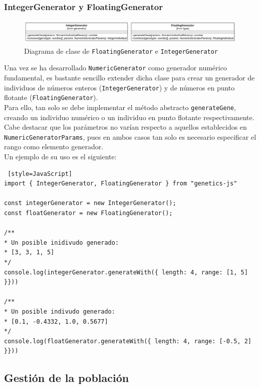 \subsubsection{IntegerGenerator y FloatingGenerator}

\begin{figure}[ht]
    \centering
    \includegraphics[scale=0.42]{mem/images/cap-4/4.2.3(Generador)/IntegerFloating.png}
    \caption{Diagrama de clase de \texttt{FloatingGenerator} e \texttt{IntegerGenerator}}
    \label{fig:generator-uml}
\end{figure}

Una vez se ha desarrollado \texttt{NumericGenerator} como generador numérico fundamental, es bastante sencillo extender dicha clase para crear un generador de individuos de números enteros (\texttt{IntegerGenerator}) y de números en punto flotante (\texttt{FloatingGenerator}). \\

Para ello, tan solo se debe implementar el método abstracto \texttt{generateGene}, creando un individuo numérico o un individuo en punto flotante respectivamente. Cabe destacar que los parámetros no varían respecto a aquellos establecidos en \texttt{NumericGeneratorParams}, pues en ambos casos tan solo es necesario especificar el rango como elemento generador. \\

Un ejemplo de su uso es el siguiente: \\

\begin{lstlisting} [style=JavaScript]
import { IntegerGenerator, FloatingGenerator } from "genetics-js"

const integerGenerator = new IntegerGenerator();
const floatGenerator = new FloatingGenerator();

/**
* Un posible inidivudo generado:
* [3, 3, 1, 5]
*/
console.log(integerGenerator.generateWith({ length: 4, range: [1, 5] }}))

/**
* Un posible indivudo generado:
* [0.1, -0.4332, 1.0, 0.5677]
*/
console.log(floatGenerator.generateWith({ length: 4, range: [-0.5, 2] }}))
\end{lstlisting}

\subsection{Gestión de la población}

